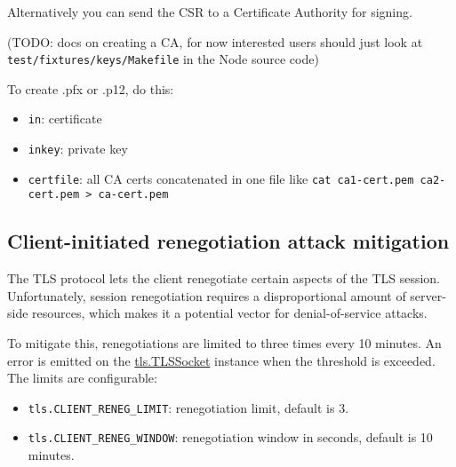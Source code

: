 Alternatively you can send the CSR to a Certificate Authority for
signing.

(TODO: docs on creating a CA, for now interested users should just look
at \texttt{test/fixtures/keys/Makefile} in the Node source code)

To create .pfx or .p12, do this:

\begin{Shaded}
\begin{Highlighting}[]
 \NormalTok{-}   \NormalTok{\textbackslash{}}
     
\end{Highlighting}
\end{Shaded}

\begin{itemize}
\itemsep1pt\parskip0pt
\item
  \texttt{in}: certificate
\item
  \texttt{inkey}: private key
\item
  \texttt{certfile}: all CA certs concatenated in one file like
  \texttt{cat ca1-cert.pem ca2-cert.pem \textgreater{} ca-cert.pem}
\end{itemize}

\subsection{Client-initiated renegotiation attack
mitigation}\label{client-initiated-renegotiation-attack-mitigation}

The TLS protocol lets the client renegotiate certain aspects of the TLS
session. Unfortunately, session renegotiation requires a disproportional
amount of server-side resources, which makes it a potential vector for
denial-of-service attacks.

To mitigate this, renegotiations are limited to three times every 10
minutes. An error is emitted on the
\hyperref[tlsux5fclassux5ftlsux5ftlssocket]{tls.TLSSocket} instance when
the threshold is exceeded. The limits are configurable:

\begin{itemize}
\item
  \texttt{tls.CLIENT\_RENEG\_LIMIT}: renegotiation limit, default is 3.
\item
  \texttt{tls.CLIENT\_RENEG\_WINDOW}: renegotiation window in seconds,
  default is 10 minutes.
\end{itemize}

